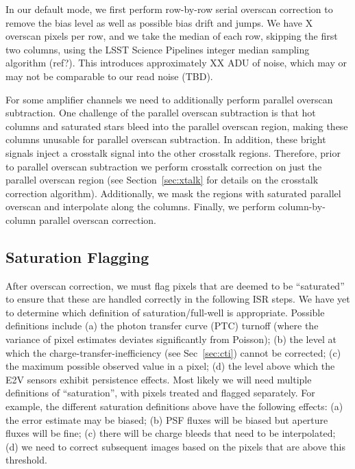 \documentclass[SE,authoryear,lsstdraft,toc]{lsstdoc}
\begin{document}
In our default mode, we first perform row-by-row serial overscan correction to
remove the bias level as well as possible bias drift and jumps.  We have X
overscan pixels per row, and we take the median of each row, skipping the first
two columns, using the LSST Science Pipelines integer median sampling algorithm
(ref?).  This introduces approximately XX ADU of noise, which may or may not be
comparable to our read noise (TBD).

For some amplifier channels we need to additionally perform parallel overscan
subtraction.  One challenge of the parallel overscan subtraction is that hot
columns and saturated stars bleed into the parallel overscan region, making
these columns unusable for parallel overscan subtraction.  In addition, these
bright signals inject a crosstalk signal into the other crosstalk regions.
Therefore, prior to parallel overscan subtraction we perform crosstalk
correction on just the parallel overscan region (see Section~\ref{sec:xtalk}
for details on the crosstalk correction algorithm).  Additionally, we mask the
regions with saturated parallel overscan and interpolate along the columns.
Finally, we perform column-by-column parallel overscan correction.

\subsection{Saturation Flagging}

After overscan correction, we must flag pixels that are deemed to be
``saturated'' to ensure that these are handled correctly in the following ISR
steps.  We have yet to determine which definition of saturation/full-well is
appropriate.  Possible definitions include (a) the photon transfer curve (PTC)
turnoff (where the variance of pixel estimates deviates significantly from
Poisson); (b) the level at which the charge-transfer-inefficiency (see
Sec~\ref{sec:cti}) cannot be corrected; (c) the maximum possible observed value
in a pixel; (d) the level above which the E2V sensors exhibit persistence
effects. Most likely we will need multiple definitions of ``saturation'', with
pixels treated and flagged separately. For example, the different saturation
definitions above have the following effects: (a) the error estimate may be
biased; (b) PSF fluxes will be biased but aperture fluxes will be fine; (c)
there will be charge bleeds that need to be interpolated; (d) we need to
correct subsequent images based on the pixels that are above this threshold.
\end{document}
